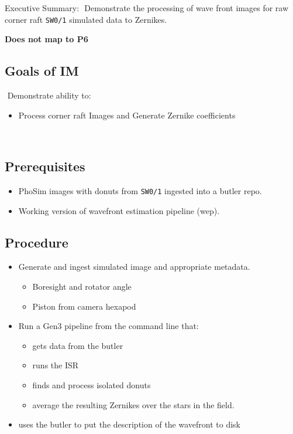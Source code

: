 
Executive Summary:
​
Demonstrate the processing of wave front images for raw corner raft \texttt{SW0/1} simulated data
to Zernikes.

\textbf{Does not map to P6}
​
\subsection{Goals of IM}
​
Demonstrate ability to:
​
\begin{itemize}
\item Process corner raft Images and Generate Zernike coefficients
\end{itemize}
​
\subsection{Prerequisites}
\begin{itemize}
\item PhoSim images with donuts from \texttt{SW0/1} ingested into a butler repo.
\item Working version of wavefront estimation pipeline (wep).
\end{itemize}

\subsection{Procedure}
\begin{itemize}
\item Generate and ingest simulated image and appropriate metadata.
  \begin{itemize}
  \item Boresight and rotator angle
  \item Piston from camera hexapod
  \end{itemize}
\item Run a Gen3 pipeline from the command line that:
  \begin{itemize}
  \item gets data from the butler
  \item runs the ISR
  \item finds and process isolated donuts
  \item average the resulting Zernikes over the stars in the field.
  \end{itemize}
  \item uses the butler to put the description of the wavefront to disk
\end{itemize}

